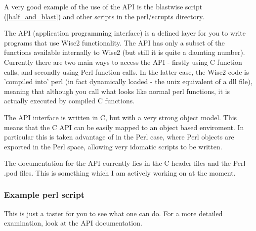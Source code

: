 \documentclass{article}
\begin{document}
A very good example of the use of the API is the blastwise script (\ref{half_and_blast})
and other scripts in the perl/scrupts directory.

The API (application programming interface) is a defined layer for you
to write programs that use Wise2 functionality. The API has only a
subset of the functions available internally to Wise2 (but still it is
quite a daunting number). Currently there are two main ways to access
the API - firstly using C function calls, and secondly using Perl
function calls. In the latter case, the Wise2 code is 'compiled into'
perl (in fact dynamically loaded - the unix equivalent of a dll file),
meaning that although you call what looks like normal perl functions,
it is actually executed by compiled C functions.

The API interface is written in C, but with a very strong object
model. This means that the C API can be easily mapped to an object
based enviroment. In particular this is taken advantage of in the Perl
case, where Perl objects are exported in the Perl space, allowing very
idomatic scripts to be written.

The documentation for the API currently lies in the C header files and
the Perl .pod files. This is something which I am actively working on
at the moment.



\subsubsection{Example perl script}

This is just a taster for you to see what one can do. For a more
detailed examination, look at the API documentation.
\end{document}
